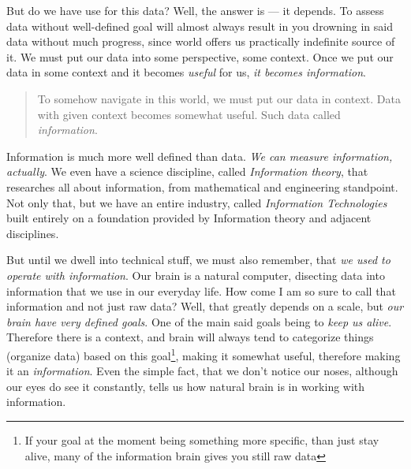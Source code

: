 \documentclass{report}
\begin{document}
            But do we have use for this data? Well, the answer is --- it depends. To assess data without well-defined goal will almost always result in you drowning in said data without much progress,
            since world offers us practically indefinite source of it. We must put our data into some perspective, some context. Once we put our data in some context and it becomes \emph{useful} for us, \emph{it becomes information}.
            
            \begin{quote}
                To somehow navigate in this world, we must put our data in context. Data with given context becomes somewhat useful. Such data called \emph{information}.
            \end{quote}

            Information is much more well defined than data. \emph{We can measure information, actually}. We even have a science discipline, called \emph{Information theory},
            that researches all about information, from mathematical and engineering standpoint. Not only that, but we have an entire industry, called \emph{Information Technologies}
            built entirely on a foundation provided by Information theory and adjacent disciplines.\par
            
            But until we dwell into technical stuff, we must also remember, that \emph{we used to operate with information}. Our brain is a natural computer, disecting data
            into information that we use in our everyday life. How come I am so sure to call that information and not just raw data? Well, that greatly depends on a 
            scale, but
            \emph{our brain have very defined goals}. One of the main said goals being to \emph{keep us alive}. Therefore there is a context, and brain will always tend to 
            categorize things (organize data) based on this goal\footnote{If your goal at the moment being something more specific, than just stay alive, many of the information brain gives you still raw data},
            making it somewhat useful, therefore making it an \emph{information}. Even the simple fact, that we don't notice our noses, although our eyes do see it constantly, 
            tells us how natural brain is in working with information. \par
            
\end{document}
